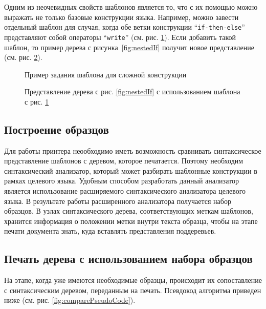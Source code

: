 Одним из неочевидных свойств шаблонов является то, что с их помощью можно выражать не только базовые конструкции языка.
Например, можно завести отдельный шаблон для случая, когда обе ветки конструкции “\lstinline{if-then-else}” представляют собой операторы “\lstinline{write}” (см. рис. \ref{fig:writeNestedInIf}). Если добавить такой шаблон, то пример дерева с рисунка~\ref{fig:nestedIf} получит новое представление (см. рис. \ref{fig:nestedIfNew}).

\begin{figure}[h!]
	
	\caption{Пример задания шаблона для сложной конструкции}
	\label{fig:writeNestedInIf}
\end{figure}

\begin{figure}[h!]
	
	\caption{Представление дерева с рис. \ref{fig:nestedIf} с использованием шаблона с рис. \ref{fig:writeNestedInIf}}
	\label{fig:nestedIfNew}
\end{figure}

\subsection{Построение образцов}

Для работы принтера неообходимо иметь возможность сравнивать синтаксическое представление шаблонов с деревом, которое печатается. Поэтому необходим синтаксический анализатор, который может разбирать шаблонные конструкции в рамках целевого языка. Удобным способом разработать данный анализатор является использование расширяемого синтаксического анализатора целевого языка. В результате работы расширенного анализатора получается набор образцов. В узлах синтаксического дерева, соответствующих меткам шаблонов, хранится информация о положении метки внутри текста образца, чтобы на этапе печати документа знать, куда вставлять представления поддеревьев.

\newpage

\subsection{Печать дерева с использованием набора образцов}

На этапе, когда уже имеются необходимые образцы, происходит их сопоставление с синтаксическим деревом, переданным на печать.
Псевдокод алгоритма приведен ниже (см. рис. \ref{fig:comparePseudoCode}).

